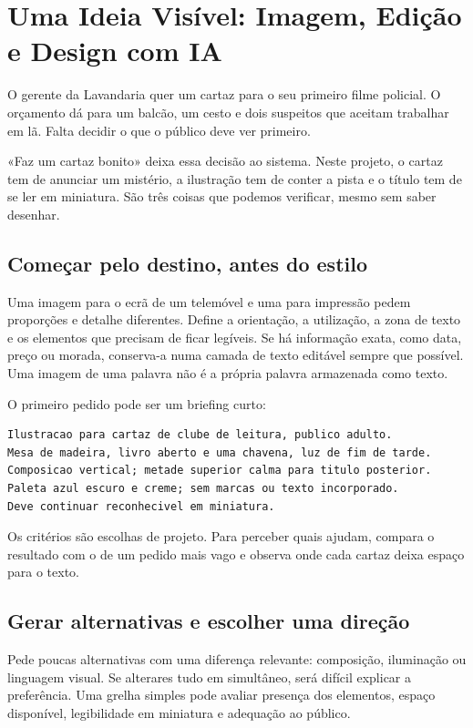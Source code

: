 \chapter{Uma Ideia Visível: Imagem, Edição e Design com IA}
\label{ch:imagem-design}

\ficcao O gerente da Lavandaria quer um cartaz para o seu primeiro filme policial. O orçamento dá para um balcão, um cesto e dois suspeitos que aceitam trabalhar em lã. Falta decidir o que o público deve ver primeiro.

«Faz um cartaz bonito» deixa essa decisão ao sistema. Neste projeto, o cartaz tem de anunciar um mistério, a ilustração tem de conter a pista e o título tem de se ler em miniatura. São três coisas que podemos verificar, mesmo sem saber desenhar.

\section{Começar pelo destino, antes do estilo}
Uma imagem para o ecrã de um telemóvel e uma para impressão pedem proporções e detalhe diferentes. Define a orientação, a utilização, a zona de texto e os elementos que precisam de ficar legíveis. Se há informação exata, como data, preço ou morada, conserva-a numa camada de texto editável sempre que possível. Uma imagem de uma palavra não é a própria palavra armazenada como texto.

O primeiro pedido pode ser um briefing curto:
\begin{lstlisting}
Ilustracao para cartaz de clube de leitura, publico adulto.
Mesa de madeira, livro aberto e uma chavena, luz de fim de tarde.
Composicao vertical; metade superior calma para titulo posterior.
Paleta azul escuro e creme; sem marcas ou texto incorporado.
Deve continuar reconhecivel em miniatura.
\end{lstlisting}
Os critérios são escolhas de projeto. Para perceber quais ajudam, compara o resultado com o de um pedido mais vago e observa onde cada cartaz deixa espaço para o texto.

\section{Gerar alternativas e escolher uma direção}
Pede poucas alternativas com uma diferença relevante: composição, iluminação ou linguagem visual. Se alterares tudo em simultâneo, será difícil explicar a preferência. Uma grelha simples pode avaliar presença dos elementos, espaço disponível, legibilidade em miniatura e adequação ao público.

